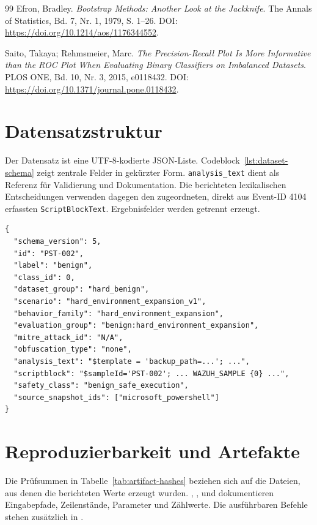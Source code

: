 \documentclass[12pt,a4paper,oneside,parskip=half]{scrreprt}
\begin{document}
\begin{thebibliography}{99}
Efron, Bradley. \emph{Bootstrap Methods: Another Look at the Jackknife}. The Annals of Statistics, Bd. 7, Nr. 1, 1979, S. 1--26. DOI: \url{https://doi.org/10.1214/aos/1176344552}.

Saito, Takaya; Rehmsmeier, Marc. \emph{The Precision-Recall Plot Is More Informative than the ROC Plot When Evaluating Binary Classifiers on Imbalanced Datasets}. PLOS ONE, Bd. 10, Nr. 3, 2015, e0118432. DOI: \url{https://doi.org/10.1371/journal.pone.0118432}.

\end{thebibliography}

\appendix

\chapter{Datensatzstruktur}
\label{app:dataset}
Der Datensatz ist eine UTF-8-kodierte JSON-Liste. Codeblock~\ref{lst:dataset-schema} zeigt zentrale Felder in gekürzter Form. \texttt{analysis\_text} dient als Referenz für Validierung und Dokumentation. Die berichteten lexikalischen Entscheidungen verwenden dagegen den zugeordneten, direkt aus Event-ID 4104 erfassten \texttt{ScriptBlockText}. Ergebnisfelder werden getrennt erzeugt.

\begin{lstlisting}[language={},caption={Vereinfachte Datensatzstruktur},label={lst:dataset-schema}]
{
  "schema_version": 5,
  "id": "PST-002",
  "label": "benign",
  "class_id": 0,
  "dataset_group": "hard_benign",
  "scenario": "hard_environment_expansion_v1",
  "behavior_family": "hard_environment_expansion",
  "evaluation_group": "benign:hard_environment_expansion",
  "mitre_attack_id": "N/A",
  "obfuscation_type": "none",
  "analysis_text": "$template = 'backup_path=...'; ...",
  "scriptblock": "$sampleId='PST-002'; ... WAZUH_SAMPLE {0} ...",
  "safety_class": "benign_safe_execution",
  "source_snapshot_ids": ["microsoft_powershell"]
}
\end{lstlisting}
\chapter{Reproduzierbarkeit und Artefakte}
\label{app:reproducibility}
Die Prüfsummen in Tabelle~\ref{tab:artifact-hashes} beziehen sich auf die Dateien, aus denen die berichteten Werte erzeugt wurden. , ,  und  dokumentieren Eingabepfade, Zeilenstände, Parameter und Zählwerte. Die ausführbaren Befehle stehen zusätzlich in .
\end{document}
